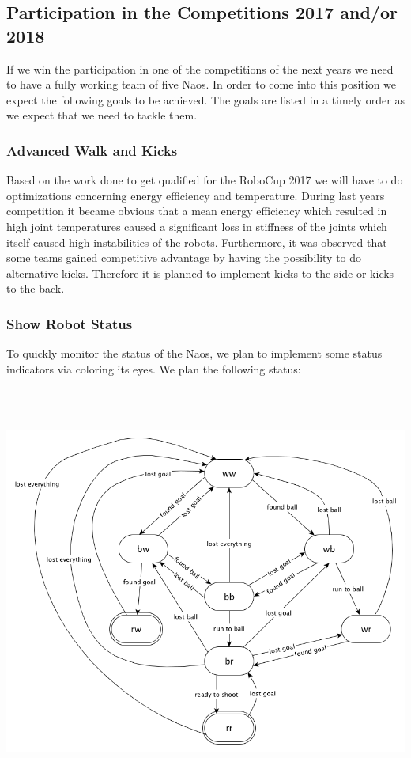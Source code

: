 \documentclass[12pt]{article}
\theoremstyle{definition}
\newcommand{\unclear}[1]{\vspace{.5em}\parbox{.9\linewidth}{\color{red}{\bf Remark: #1}}\vspace{.5em}}
\begin{document}
\subsection{Participation in the Competitions 2017 and/or 2018}
If we win the participation in one of the competitions of the next years we need to have a fully working team of five Naos. In order to come into this position we expect the following goals to be achieved. The goals are listed in a timely order as we expect that we need to tackle them.

\subsubsection{Advanced Walk and Kicks}
Based on the work done to get qualified for the RoboCup 2017 we will have to do optimizations concerning energy efficiency and temperature. During last years competition it became obvious that a mean energy efficiency which resulted in high joint temperatures caused a significant loss in stiffness of the joints which itself caused high instabilities of the robots. Furthermore, it was observed that some teams gained competitive advantage by having the possibility to do alternative kicks. Therefore it is planned to implement kicks to the side or kicks to the back.

\subsubsection{Show Robot Status}
To quickly monitor the status of the Naos, we plan to implement some status indicators via coloring its eyes. We plan the following status:
\\[1em]
\unclear{In the next table: What is if the Nao sees the goal? What means the red/red status? What do you mean by ``the x/y state is necessary?}
\\
\unclear{Please check if the state diagram is okay, and the table beneath}\\
\includegraphics[scale=.5]{stateDiagram.png} 
\end{document}
